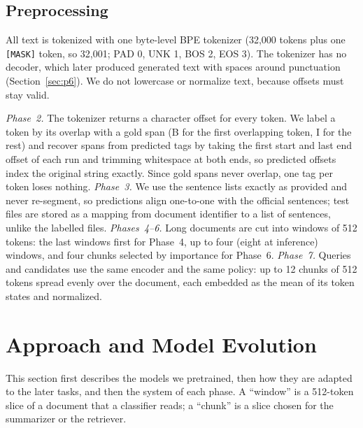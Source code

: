 \documentclass[10pt,a4paper]{article}
\begin{document}
\subsection{Preprocessing}
All text is tokenized with one byte-level BPE tokenizer (32{,}000 tokens plus one \texttt{[MASK]} token, so 32{,}001; PAD 0, UNK 1, BOS 2, EOS 3). The tokenizer has no decoder, which later produced generated text with spaces around punctuation (Section~\ref{sec:p6}). We do not lowercase or normalize text, because offsets must stay valid.

\emph{Phase~2.} The tokenizer returns a character offset for every token. We label a token by its overlap with a gold span (B for the first overlapping token, I for the rest) and recover spans from predicted tags by taking the first start and last end offset of each run and trimming whitespace at both ends, so predicted offsets index the original string exactly. Since gold spans never overlap, one tag per token loses nothing. \emph{Phase~3.} We use the sentence lists exactly as provided and never re-segment, so predictions align one-to-one with the official sentences; test files are stored as a mapping from document identifier to a list of sentences, unlike the labelled files. \emph{Phases~4--6.} Long documents are cut into windows of 512 tokens: the last windows first for Phase~4, up to four (eight at inference) windows, and four chunks selected by importance for Phase~6. \emph{Phase~7.} Queries and candidates use the same encoder and the same policy: up to 12 chunks of 512 tokens spread evenly over the document, each embedded as the mean of its token states and normalized.

\section{Approach and Model Evolution}
This section first describes the models we pretrained, then how they are adapted to the later tasks, and then the system of each phase. A ``window'' is a 512-token slice of a document that a classifier reads; a ``chunk'' is a slice chosen for the summarizer or the retriever.
\end{document}
